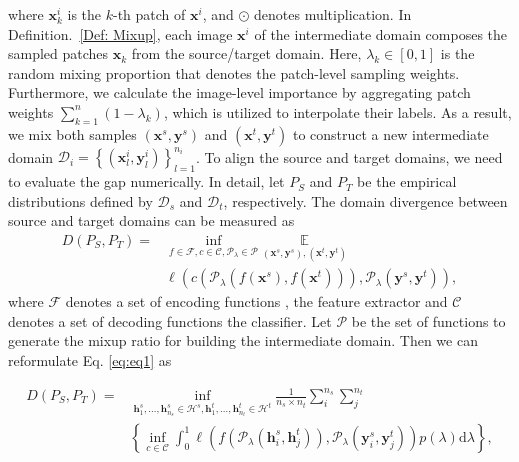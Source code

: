 \documentclass[10pt,twocolumn,letterpaper, ]{article}
\begin{document}
where $\boldsymbol{x}^{i}_{k}$ is the $k$-th patch of $\boldsymbol{x}^{i}$, and $\odot$ denotes multiplication. In Definition.~\ref{Def: Mixup}, each image $\boldsymbol{x}^{i}$ of the intermediate domain composes the sampled patches $\boldsymbol{x}_{k}$ from the source/target domain. Here, $\lambda_k \in [0,1]$ is the random mixing proportion that denotes the patch-level sampling weights. Furthermore, we calculate the image-level importance by aggregating patch weights $\sum_{k=1}^{n}(1-\lambda_{k})$, which is utilized to interpolate their labels. As a result, we mix both samples $(\boldsymbol{x}^s, \boldsymbol{y}^s)$ and $(\boldsymbol{x}^t, \boldsymbol{y}^t)$ to construct a new intermediate domain $\mathcal D_{i}=\left\{\left(\boldsymbol{x}^{i}_{l}, \boldsymbol{y}^{i}_{l}\right)\right\}_{l=1}^{n_{i}}$. 
To align the source and target domains, we need to evaluate the gap numerically. In detail, let $P_S$ and $P_T$ be the empirical distributions defined by $\mathcal{D}_{s}$ and $\mathcal{D}_{t}$, respectively. The domain divergence between source and target domains can be measured as 
{\setlength\abovedisplayskip{2pt}
\setlength\belowdisplayskip{2pt}
\begin{equation}
\label{eq:eq1}
\begin{aligned}
 D(P_S,P_T)
 =&\inf _{f \in \mathcal{F}, c \in \mathcal{C}, \mathcal{P}_{\lambda} \in \mathcal{P}} \underset{(\boldsymbol{x}^s, \boldsymbol{y}^s),\left(\boldsymbol{x}^{t}, \boldsymbol{y}^{t}\right)} {\mathbb{E}}\\ &\ell\left(c\left(\mathcal{P}_{\lambda}\left(f(\boldsymbol{x}^{s}), f\left(\boldsymbol{x}^{t}\right)\right)\right), \mathcal{P}_{\lambda}\left(\boldsymbol{y}^{s}, \boldsymbol{y}^{t}\right)\right),
\end{aligned}
\end{equation}}
where $\mathcal{F}$ denotes a set of encoding functions \ie, the feature extractor and $\mathcal{C}$ denotes a set of decoding functions \ie the classifier. Let $\mathcal{P}$ be the set of functions to generate the mixup ratio for building the intermediate domain. Then we can reformulate Eq. \ref{eq:eq1} as
{\setlength\abovedisplayskip{2pt}
\setlength\belowdisplayskip{2pt}
\begin{small}
\begin{equation}
\begin{aligned}
\label{eq:D}
  D\left(P_{S},P_{T}\right)
  =& \inf_{\boldsymbol{h}_{1}^{s}, \ldots, \boldsymbol{h}_{n_{s}}^{s} \in \mathcal{H}^{s},\boldsymbol{h}_{1}^{t}, \ldots, \boldsymbol{h}_{n_{t}}^{t} \in \mathcal{H}^{t}}\frac{1}{n_{s} \times n_{t}} \sum_{i}^{n_{s}}\sum_{j}^{n_{t}}\\
  &\left\{\inf _{c \in \mathcal{C}} \int_{0}^{1} \ell\left(f\left(\mathcal{P}_{\lambda}\left(\boldsymbol{h}_{i}^{s}, \boldsymbol{h}_{j}^{t}\right)\right), \mathcal{P}_{\lambda}\left(\boldsymbol{y}_{i}^{s}, \boldsymbol{y}_{j}^{t}\right)\right) p(\lambda) \mathrm{d} \lambda\right\},
\end{aligned}
\end{equation}
\end{small}}
\end{document}
